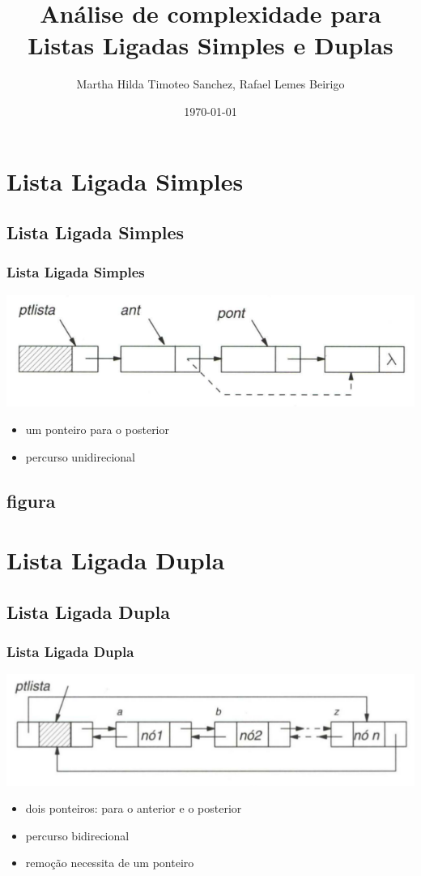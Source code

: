 \documentclass[bigger]{beamer}
\author{Martha Hilda Timoteo Sanchez, Rafael Lemes Beirigo}
\date{\today}
\title{Análise de complexidade para Listas Ligadas Simples e Duplas}
\begin{document}
\maketitle
\tableofcontents


\section{Lista Ligada Simples}
\label{sec-1}
\subsection{Lista Ligada Simples}
\label{sec-1-1}
\subsubsection{Lista Ligada Simples}
\label{sec-1-1-1}
\includegraphics[width=.9\linewidth]{fig/listasimple.png}
\begin{itemize}
\item um ponteiro para o posterior
\item percurso unidirecional
\end{itemize}
\subsection{figura}
\label{sec-1-2}
\section{Lista Ligada Dupla}
\label{sec-2}
\subsection{Lista Ligada Dupla}
\label{sec-2-1}
\subsubsection{Lista Ligada Dupla}
\label{sec-2-1-1}
\includegraphics[width=.9\linewidth]{fig/listadoble.png}
\begin{itemize}
\item dois ponteiros: para o anterior e o posterior
\item percurso bidirecional
\item remoção necessita de um ponteiro
\end{itemize}
\end{document}

